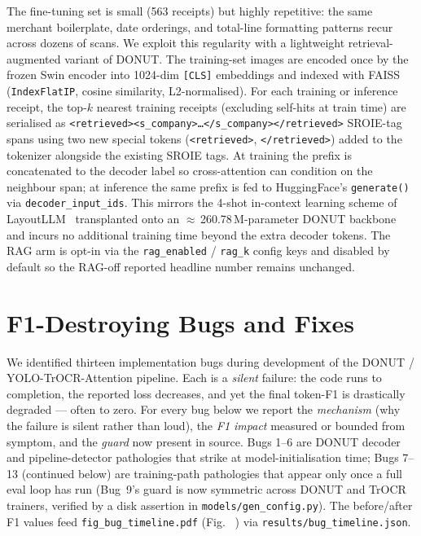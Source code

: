 \documentclass[conference]{IEEEtran}
\makeatletter
\newcommand{\figref}[1]{%
  \@ifundefined{r@#1}{\textit{[figure absent]}}{\ref{#1}}%
}
\makeatother
\begin{document}
The fine-tuning set is small (563 receipts) but highly repetitive:
the same merchant boilerplate, date orderings, and total-line
formatting patterns recur across dozens of scans.  We exploit this
regularity with a lightweight retrieval-augmented variant of DONUT.
The training-set images are encoded once by the frozen Swin encoder
into 1024-dim \texttt{[CLS]} embeddings and indexed with FAISS
(\texttt{IndexFlatIP}, cosine similarity, L2-normalised).  For each
training or inference receipt, the top-$k$ nearest training receipts
(excluding self-hits at train time) are serialised as
\texttt{<retrieved><s\_company>\ldots</s\_company></retrieved>}
SROIE-tag spans using two new special tokens
(\texttt{<retrieved>}, \texttt{</retrieved>}) added to the
tokenizer alongside the existing SROIE tags.  At training the prefix
is concatenated to the decoder label so cross-attention can
condition on the neighbour span; at inference the same prefix is
fed to HuggingFace's \texttt{generate()} via
\texttt{decoder\_input\_ids}.  This mirrors the 4-shot in-context
learning scheme of LayoutLLM~\cite{luo2024layoutllm} transplanted
onto an $\approx$\,260.78\,M-parameter DONUT backbone and incurs no additional training
time beyond the extra decoder tokens.  The RAG arm is opt-in via the
\texttt{rag\_enabled} / \texttt{rag\_k} config keys and disabled by
default so the RAG-off reported headline number remains unchanged.


\section{F1-Destroying Bugs and Fixes}
\label{sec:bugs}
\sloppy  %

We identified thirteen implementation bugs during development of the
DONUT / YOLO-TrOCR-Attention pipeline.  Each is a \emph{silent}
failure: the code runs to completion, the reported loss decreases,
and yet the final token-F1 is drastically degraded --- often to
zero.  For every bug below we report the \emph{mechanism} (why the
failure is silent rather than loud), the \emph{F1 impact} measured
or bounded from symptom, and the \emph{guard} now present in source.
Bugs 1--6 are DONUT decoder and pipeline-detector pathologies that
strike at model-initialisation time; Bugs 7--13 (continued below)
are training-path pathologies that
appear only once a full eval loop has run (Bug~9's guard is now
symmetric across DONUT and TrOCR trainers, verified by a disk
assertion in \texttt{models/gen\_config.py}).  The before/after F1
values feed \texttt{fig\_bug\_timeline.pdf}
(Fig.~\figref{fig:bug_timeline}) via
\texttt{results/bug\_timeline.json}.
\end{document}
